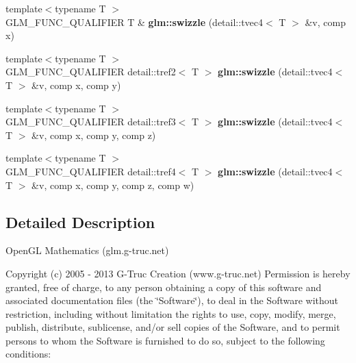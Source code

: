 \begin{DoxyCompactItemize}
\item 
\hypertarget{namespaceglm_a57cf00730195b5faf883be200f8fa45c}{}{\footnotesize template$<$typename T $>$ }\\G\+L\+M\+\_\+\+F\+U\+N\+C\+\_\+\+Q\+U\+A\+L\+I\+F\+I\+E\+R T \& {\bfseries glm\+::swizzle} (detail\+::tvec4$<$ T $>$ \&v, comp x)\label{namespaceglm_a57cf00730195b5faf883be200f8fa45c}

\item 
\hypertarget{namespaceglm_ae7b9acb2c1ba906c2fa049398e434068}{}{\footnotesize template$<$typename T $>$ }\\G\+L\+M\+\_\+\+F\+U\+N\+C\+\_\+\+Q\+U\+A\+L\+I\+F\+I\+E\+R detail\+::tref2$<$ T $>$ {\bfseries glm\+::swizzle} (detail\+::tvec4$<$ T $>$ \&v, comp x, comp y)\label{namespaceglm_ae7b9acb2c1ba906c2fa049398e434068}

\item 
\hypertarget{namespaceglm_af470a4abb69fc8912ed2b53b1d4e0425}{}{\footnotesize template$<$typename T $>$ }\\G\+L\+M\+\_\+\+F\+U\+N\+C\+\_\+\+Q\+U\+A\+L\+I\+F\+I\+E\+R detail\+::tref3$<$ T $>$ {\bfseries glm\+::swizzle} (detail\+::tvec4$<$ T $>$ \&v, comp x, comp y, comp z)\label{namespaceglm_af470a4abb69fc8912ed2b53b1d4e0425}

\item 
\hypertarget{namespaceglm_a1aff113741fa5c0bd84fe626f8d5ee78}{}{\footnotesize template$<$typename T $>$ }\\G\+L\+M\+\_\+\+F\+U\+N\+C\+\_\+\+Q\+U\+A\+L\+I\+F\+I\+E\+R detail\+::tref4$<$ T $>$ {\bfseries glm\+::swizzle} (detail\+::tvec4$<$ T $>$ \&v, comp x, comp y, comp z, comp w)\label{namespaceglm_a1aff113741fa5c0bd84fe626f8d5ee78}

\end{DoxyCompactItemize}


\subsection{Detailed Description}
Open\+G\+L Mathematics (glm.\+g-\/truc.\+net)

Copyright (c) 2005 -\/ 2013 G-\/\+Truc Creation (www.\+g-\/truc.\+net) Permission is hereby granted, free of charge, to any person obtaining a copy of this software and associated documentation files (the \char`\"{}\+Software\char`\"{}), to deal in the Software without restriction, including without limitation the rights to use, copy, modify, merge, publish, distribute, sublicense, and/or sell copies of the Software, and to permit persons to whom the Software is furnished to do so, subject to the following conditions\+:

